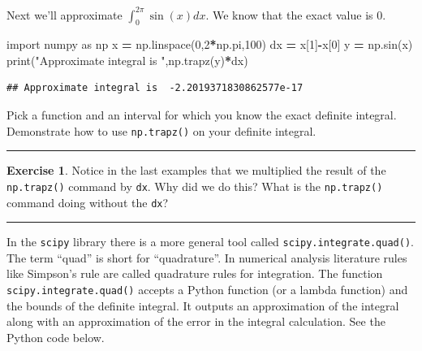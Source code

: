 \documentclass[
]{book}
\newenvironment{Shaded}{\begin{snugshade}}{\end{snugshade}}
\newcommand{\BuiltInTok}[1]{#1}
\newcommand{\DecValTok}[1]{\textcolor[rgb]{0.00,0.00,0.81}{#1}}
\newcommand{\ImportTok}[1]{#1}
\newcommand{\NormalTok}[1]{#1}
\newcommand{\OperatorTok}[1]{\textcolor[rgb]{0.81,0.36,0.00}{\textbf{#1}}}
\newcommand{\StringTok}[1]{\textcolor[rgb]{0.31,0.60,0.02}{#1}}
\theoremstyle{definition}
\theoremstyle{definition}
\theoremstyle{definition}
\newtheorem{exercise}{Exercise}[chapter]
\theoremstyle{remark}
\begin{document}
Next we'll approximate \(\int_0^{2\pi} \sin(x) dx\). We know that the exact value is 0.

\begin{Shaded}
\begin{Highlighting}[]
\ImportTok{import}\NormalTok{ numpy }\ImportTok{as}\NormalTok{ np}
\NormalTok{x }\OperatorTok{=}\NormalTok{ np.linspace(}\DecValTok{0}\NormalTok{,}\DecValTok{2}\OperatorTok{*}\NormalTok{np.pi,}\DecValTok{100}\NormalTok{)}
\NormalTok{dx }\OperatorTok{=}\NormalTok{ x[}\DecValTok{1}\NormalTok{]}\OperatorTok{{-}}\NormalTok{x[}\DecValTok{0}\NormalTok{]}
\NormalTok{y }\OperatorTok{=}\NormalTok{ np.sin(x)}
\BuiltInTok{print}\NormalTok{(}\StringTok{"Approximate integral is "}\NormalTok{,np.trapz(y)}\OperatorTok{*}\NormalTok{dx)}
\end{Highlighting}
\end{Shaded}

\begin{verbatim}
## Approximate integral is  -2.2019371830862577e-17
\end{verbatim}

Pick a function and an interval for which you know the exact definite integral. Demonstrate how to use \texttt{np.trapz()} on your definite integral.

\begin{center}\rule{0.5\linewidth}{0.5pt}\end{center}

\begin{exercise}
\protect\hypertarget{exr:unnamed-chunk-229}{}{\label{exr:unnamed-chunk-229} }Notice in the last examples that we multiplied the result of the \texttt{np.trapz()} command by \texttt{dx}. Why did we do this? What is the \texttt{np.trapz()} command doing without the \texttt{dx}?
\end{exercise}

\begin{center}\rule{0.5\linewidth}{0.5pt}\end{center}

In the \texttt{scipy} library there is a more general tool called \texttt{scipy.integrate.quad()}. The term ``quad'' is short for ``quadrature''. In numerical analysis literature rules like Simpson's rule are called quadrature rules for integration. The function \texttt{scipy.integrate.quad()} accepts a Python function (or a lambda function) and the bounds of the definite integral. It outputs an approximation of the integral along with an approximation of the error in the integral calculation. See the Python code below.
\end{document}
